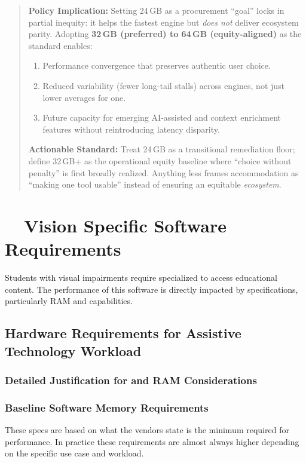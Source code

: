\begin{quote}
	\textbf{Policy Implication:} Setting 24\,GB as a procurement “goal” locks in partial inequity: it helps the fastest engine but \emph{does not} deliver ecosystem parity. Adopting \textbf{32\,GB (preferred) to 64\,GB (equity-aligned)} as the standard enables:
	\begin{enumerate}
		\item Performance convergence that preserves authentic user choice.
		\item Reduced variability (fewer long-tail stalls) across engines, not just lower averages for one.
		\item Future capacity for emerging AI‑assisted and context enrichment features without reintroducing latency disparity.
	\end{enumerate}
	\textbf{Actionable Standard:} Treat 24\,GB as a transitional remediation floor; define 32\,GB+ as the operational equity baseline where “choice without penalty” is first broadly realized. Anything less frames accommodation as “making one tool usable” instead of ensuring an equitable \emph{ecosystem}.
\end{quote}

\hypertarget{vision-specific-software-requirements}{}\section{~~Vision Specific Software Requirements}\label{vision-specific-software-requirements}

Students with visual impairments require specialized  to access educational content. The performance of this software is directly impacted by  specifications, particularly RAM and  capabilities.

\subsection{Hardware Requirements for Assistive Technology Workload}\label{hardware-justification-ai-ram}

\subsubsection{Detailed Justification for  and RAM Considerations}

\subsubsection{Baseline Software Memory Requirements}
These  specs are based on what the vendors state is the minimum required for performance. In practice these requirements are almost always higher depending on the specific use case and workload.

